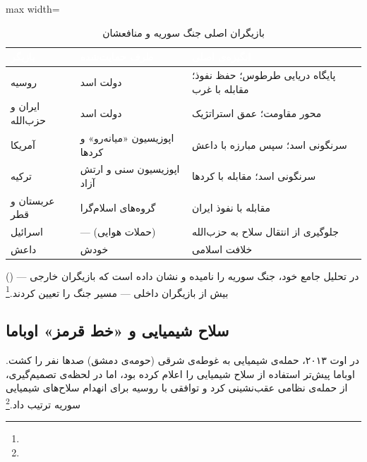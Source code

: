 \begin{table}[htbp]
\centering
\caption{بازیگران اصلی جنگ سوریه و منافعشان}
\label{tab:ch10-syria-actors}
\begin{adjustbox}{max width=\linewidth}
\begin{tabularx}{\linewidth}{>{\raggedleft\arraybackslash}p{2.5cm} >{\raggedleft\arraybackslash}p{3cm} >{\raggedleft\arraybackslash}X}
\toprule
\rowcolor{PrimaryDeep}
\textcolor{white}{\textbf{بازیگر}} & \textcolor{white}{\textbf{طرف حمایت‌شده}} & \textcolor{white}{\textbf{انگیزه‌ی اصلی}} \\
\midrule
روسیه & دولت اسد & پایگاه دریایی طرطوس؛ حفظ نفوذ؛ مقابله با غرب \\
\rowcolor{NeutralLight}
ایران و حزب‌الله & دولت اسد & محور مقاومت؛ عمق استراتژیک \\
آمریکا & اپوزیسیون «میانه‌رو» و کردها & سرنگونی اسد؛ سپس مبارزه با داعش \\
\rowcolor{NeutralLight}
ترکیه & اپوزیسیون سنی و ارتش آزاد & سرنگونی اسد؛ مقابله با کردها \\
عربستان و قطر & گروه‌های اسلام‌گرا & مقابله با نفوذ ایران \\
\rowcolor{NeutralLight}
اسرائیل & — (حملات هوایی) & جلوگیری از انتقال سلاح به حزب‌الله \\
داعش & خودش & خلافت اسلامی \\
\bottomrule
\end{tabularx}
\end{adjustbox}
\end{table}

 () در تحلیل جامع خود، جنگ سوریه را  نامیده و نشان داده است که بازیگران خارجی — بیش از بازیگران داخلی — مسیر جنگ را تعیین کردند.\footnote{}

\subsection{سلاح شیمیایی و «خط قرمز» اوباما}
\label{subsec:ch10-syria-chemical}

در اوت ۲۰۱۳، حمله‌ی شیمیایی به غوطه‌ی شرقی (حومه‌ی دمشق) صدها نفر را کشت. اوباما پیش‌تر استفاده از سلاح شیمیایی را  اعلام کرده بود، اما در لحظه‌ی تصمیم‌گیری، از حمله‌ی نظامی عقب‌نشینی کرد و توافقی با روسیه برای انهدام سلاح‌های شیمیایی سوریه ترتیب داد.\footnote{}

